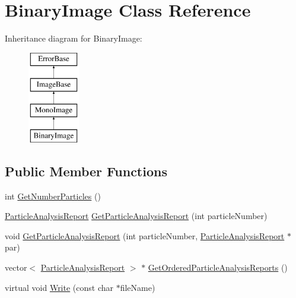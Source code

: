 \hypertarget{classBinaryImage}{
\section{BinaryImage Class Reference}
\label{classBinaryImage}
}
Inheritance diagram for BinaryImage:\begin{figure}[H]
\begin{center}
\leavevmode
\includegraphics[height=4.000000cm]{classBinaryImage}
\end{center}
\end{figure}
\subsection*{Public Member Functions}
\begin{DoxyCompactItemize}
\item 
int \hyperlink{classBinaryImage_a3fd87b1afd71c9b11df7c093160446bb}{GetNumberParticles} ()
\item 
\hyperlink{structParticleAnalysisReport__struct}{ParticleAnalysisReport} \hyperlink{classBinaryImage_af4081d0bdd38f0a7bc61dfc847e37bab}{GetParticleAnalysisReport} (int particleNumber)
\item 
void \hyperlink{classBinaryImage_ab6ac2e623b1c674ae29a49bb8581d687}{GetParticleAnalysisReport} (int particleNumber, \hyperlink{structParticleAnalysisReport__struct}{ParticleAnalysisReport} $\ast$par)
\item 
vector$<$ \hyperlink{structParticleAnalysisReport__struct}{ParticleAnalysisReport} $>$ $\ast$ \hyperlink{classBinaryImage_acbb38776ca7e84365b0fe6a84d81bd08}{GetOrderedParticleAnalysisReports} ()
\item 
virtual void \hyperlink{classBinaryImage_a90af62ef3e71b4b2b487ebad7410042f}{Write} (const char $\ast$fileName)
\end{DoxyCompactItemize}


